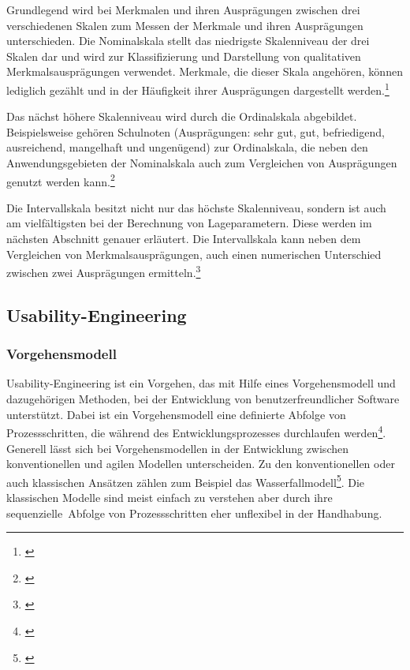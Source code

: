 Grundlegend wird bei Merkmalen und ihren Ausprägungen zwischen drei verschiedenen Skalen zum Messen der Merkmale und ihren Ausprägungen unterschieden. Die Nominalskala stellt das niedrigste Skalenniveau der drei Skalen dar und wird zur Klassifizierung und Darstellung von qualitativen Merkmalsausprägungen verwendet. Merkmale, die dieser Skala angehören, können lediglich gezählt und in der Häufigkeit ihrer Ausprägungen dargestellt werden.\footnote{\cite[vgl.][15\psqq]{Statistik2016}}

Das nächst höhere Skalenniveau wird durch die Ordinalskala abgebildet. Beispielsweise gehören Schulnoten (Ausprägungen: sehr gut, gut, befriedigend, ausreichend, mangelhaft und ungenügend) zur Ordinalskala, die neben den Anwendungsgebieten der Nominalskala auch zum Vergleichen von Ausprägungen genutzt werden kann.\footnote{\cite[vgl.][15\psqq]{Statistik2016}}

Die Intervallskala besitzt nicht nur das höchste Skalenniveau, sondern ist auch am vielfältigsten bei der Berechnung von Lageparametern. Diese werden im nächsten Abschnitt genauer erläutert. Die Intervallskala kann neben dem Vergleichen von Merkmalsausprägungen, auch einen numerischen Unterschied zwischen zwei Ausprägungen ermitteln.\footnote{\cite[vgl.][15\psqq]{Statistik2016}}


\subsection{Usability-Engineering}
\subsubsection{Vorgehensmodell}
\label{sec:vorgehensmodellUsabilityEngineering}
Usability-Engineering ist ein Vorgehen, das mit Hilfe eines Vorgehensmodell und dazugehörigen Methoden, bei der Entwicklung von benutzerfreundlicher Software unterstützt. Dabei ist ein Vorgehensmodell eine definierte Abfolge von Prozessschritten, die während des Entwicklungsprozesses durchlaufen werden\footnote{\cite[vgl.][7]{Richter2013}}. Generell lässt sich bei Vorgehensmodellen in der Entwicklung zwischen konventionellen und agilen Modellen unterscheiden. Zu den konventionellen oder auch klassischen Ansätzen zählen zum Beispiel das Wasserfallmodell\footnote{\cite[vgl.][27\psqq]{Brandt2008}}. Die klassischen Modelle sind meist einfach zu verstehen aber durch ihre sequenzielle\ Abfolge von Prozessschritten eher unflexibel in der Handhabung.

